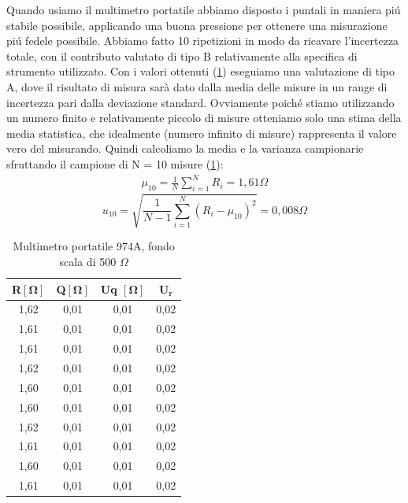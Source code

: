 Quando usiamo il multimetro portatile abbiamo disposto i puntali in maniera pi\'u stabile possibile, applicando una buona pressione per ottenere una misurazione pi\'u fedele possibile.
Abbiamo fatto 10 ripetizioni in modo da ricavare l'incertezza totale, con il contributo valutato di tipo B relativamente alla specifica di strumento utilizzato.
\newline
\newline
Con i valori ottenuti (\ref{tab:mult_port}) eseguiamo una valutazione di tipo A, dove il risultato di misura sarà dato dalla media delle misure in un range di incertezza pari dalla deviazione standard. Ovviamente poich\'e stiamo utilizzando un numero finito e relativamente piccolo di misure otteniamo solo una stima della media statistica, che idealmente (numero infinito di misure) rappresenta il valore vero del misurando. Quindi calcoliamo la media e la varianza campionarie sfruttando il campione di N = 10 misure (\ref{tab:mult_port}):
\begin{align*}
    \mu_{10}=\frac{1}{N}\sum_{i=1}^{N}R_{i}=1,61\Omega
\end{align*}
\begin{equation*}
    u_{10}=\sqrt{\frac{1}{N-1}\sum_{i=1}^{N}(R_i-\mu_{10})^{2}}=0,008\Omega 
\end{equation*}
\FloatBarrier

\begin{table}[!ht]
    \centering
    \caption{Multimetro portatile 974A, fondo scala di 500 $\Omega$}
    \begin{tabular}{|c|c|c|c|}
    \hline
        \textbf{R}$\bm{[\Omega]}$ & \textbf{Q}$\bm{[\Omega]}$ & \textbf{Uq} $\bm{[\Omega]}$ & $\bm{U_r}$ \\ \hline
        1,62 & 0,01 & 0,01 & 0,02  \\ \hline
        1,61 & 0,01 & 0,01 & 0,02  \\ \hline
        1,61 & 0,01 & 0,01 & 0,02  \\ \hline
        1,62 & 0,01 & 0,01 & 0,02  \\ \hline
        1,60 & 0,01 & 0,01 & 0,02  \\ \hline
        1,60 & 0,01 & 0,01 & 0,02  \\ \hline
        1,62 & 0,01 & 0,01 & 0,02  \\ \hline
        1,61 & 0,01 & 0,01 & 0,02  \\ \hline
        1,60 & 0,01 & 0,01 & 0,02  \\ \hline
        1,61 & 0,01 & 0,01 & 0,02 \\ \hline
    \end{tabular}
    
    \label{tab:mult_port}
\end{table}
\FloatBarrier
\clearpage

